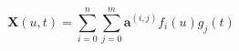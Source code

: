 \begin{equation}
\mathbf{X}(u, t)=\sum_{i=0}^{n} \sum_{j=0}^{m} \mathbf{a}^{(i, j)} f_{i}(u) g_{j}(t)
\label{ffd_2d}
\end{equation}